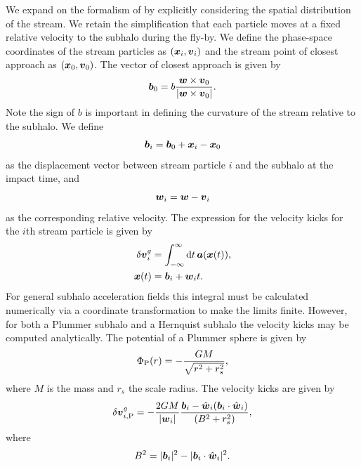 \documentclass[useAMS,usenatbib,fleqn,a4paper]{mn2e}
\def\d{{\rm d}}
\newcommand{\bs}[1]{\bmath{#1}}
\begin{document}
We expand on the formalism of \cite{ErkalBelokurov2015} by explicitly considering the spatial distribution of the stream. We retain the simplification that each particle moves at a fixed relative velocity to the subhalo during the fly-by. We define the phase-space coordinates of the stream particles as $(\bs{x}_i,\bs{v}_i)$ and the stream point of closest approach as $(\bs{x}_0,\bs{v}_0)$. The vector of closest approach is given by
\begin{equation}
\bs{b}_0=b\frac{\bs{w}\times\bs{v}_0}{|\bs{w}\times\bs{v}_0|}.
\end{equation}
Note the sign of $b$ is important in defining the curvature of the stream relative to the subhalo. We define
\begin{equation}
\bs{b}_i = \bs{b}_0+\bs{x}_i-\bs{x}_0
\end{equation}
as the displacement vector between stream particle $i$ and the subhalo at the impact time, and
\begin{equation}
\bs{w}_i=\bs{w}-\bs{v}_i
\end{equation}
as the corresponding relative velocity. The expression for the velocity kicks for the $i$th stream particle is given by
\begin{equation}
\begin{split}
\delta\bs{v}^g_i &= \int_{-\infty}^{\infty} \d t\,\bs{a}(\bs{x}(t)),\\
\bs{x}(t)&=\bs{b}_i+\bs{w}_it.
\end{split}
\end{equation}For general subhalo acceleration fields this integral must be calculated numerically via a coordinate transformation to make the limits finite. However, for both a Plummer subhalo and a Hernquist subhalo the velocity kicks may be computed analytically. The potential of a Plummer sphere is given by
\begin{equation}
\Phi_{\rm P}(r) = -\frac{GM}{\sqrt{r^2+r_s^2}},
\end{equation}
where $M$ is the mass and $r_s$ the scale radius. The velocity kicks are given by
\begin{equation}
\delta\bs{v}^{g}_{i,\mathrm{P}} = -\frac{2GM}{|\bs{w}_i|}
\frac{\bs{b}_i-\hat{\bs{w}}_i(\bs{b}_i\cdot\hat{\bs{w}}_i)}
{(B^2+r_s^2)},
\label{curved}
\end{equation}
where
\begin{equation}
B^2=|\bs{b}_i|^2
-|\bs{b}_i\cdot\hat{\bs{w}}_i|^2.
\end{equation}
\end{document}
